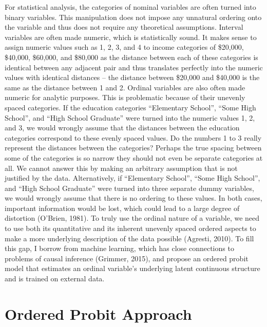 \documentclass[12pt,econ]{sources/authesis}
\begin{document}
For statistical analysis, the categories of nominal variables are often turned into binary variables. This manipulation does not impose any unnatural ordering onto the variable and thus does not require any theoretical assumptions. Interval variables are often made numeric, which is statistically sound. It makes sense to assign numeric values such as 1, 2, 3, and 4 to income categories of \$20,000, \$40,000, \$60,000, and \$80,000 as the distance between each of these categories is identical between any adjacent pair and thus translates perfectly into the numeric values with identical distances -- the distance between \$20,000 and \$40,000 is the same as the distance between 1 and 2. Ordinal variables are also often made numeric for analytic purposes. This is problematic because of their unevenly spaced categories. If the education categories ``Elementary School'', ``Some High School'', and ``High School Graduate'' were turned into the numeric values 1, 2, and 3, we would wrongly assume that the distances between the education categories correspond to these evenly spaced values. Do the numbers 1 to 3 really represent the distances between the categories? Perhaps the true spacing between some of the categories is so narrow they should not even be separate categories at all. We cannot answer this by making an arbitrary assumption that is not justified by the data. Alternatively, if ``Elementary School'', ``Some High School'', and ``High School Graduate'' were turned into three separate dummy variables, we would wrongly assume that there is no ordering to these values. In both cases, important information would be lost, which could lead to a large degree of distortion (O'Brien, 1981). To truly use the ordinal nature of a variable, we need to use both its quantitative and its inherent unevenly spaced ordered aspects to make a more underlying description of the data possible (Agresti, 2010). To fill this gap, I borrow from machine learning, which has close connections to problems of causal inference (Grimmer, 2015), and propose an ordered probit model that estimates an ordinal variable's underlying latent continuous structure and is trained on external data.

\hypertarget{intro-op}{%
\section{Ordered Probit Approach}\label{intro-op}}
\end{document}
